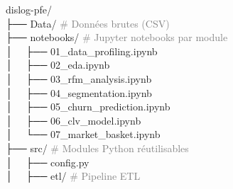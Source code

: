 \documentclass[11pt,a4paper]{article}
\begin{document}
\begin{tcolorbox}[
  enhanced, colback=codebg, colframe=graytext!40,
  boxrule=0.5pt, arc=3pt,
  top=8pt, bottom=8pt, left=12pt, right=12pt,
  fontupper=\ttfamily\small\color{darktext}
]
dislog-pfe/                                         \\
\hspace*{1em}├── Data/          \hspace{2em}\textcolor{graytext}{\# Données brutes (CSV)}                  \\
\hspace*{1em}├── notebooks/     \hspace{1.4em}\textcolor{graytext}{\# Jupyter notebooks par module}         \\
\hspace*{2em}│~~ ├── 01\_data\_profiling.ipynb                                             \\
\hspace*{2em}│~~ ├── 02\_eda.ipynb                                                         \\
\hspace*{2em}│~~ ├── 03\_rfm\_analysis.ipynb                                               \\
\hspace*{2em}│~~ ├── 04\_segmentation.ipynb                                                \\
\hspace*{2em}│~~ ├── 05\_churn\_prediction.ipynb                                           \\
\hspace*{2em}│~~ ├── 06\_clv\_model.ipynb                                                  \\
\hspace*{2em}│~~ └── 07\_market\_basket.ipynb                                              \\
\hspace*{1em}├── src/           \hspace{2em}\textcolor{graytext}{\# Modules Python réutilisables}           \\
\hspace*{2em}│~~ ├── config.py                                                             \\
\hspace*{2em}│~~ ├── etl/       \hspace{2em}\textcolor{graytext}{\# Pipeline ETL}                          \\

\end{tcolorbox}
\end{document}
